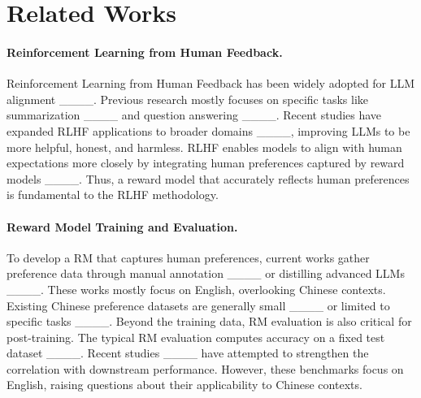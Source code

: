 \section{Related Works}
\paragraph{Reinforcement Learning from Human Feedback.}
Reinforcement Learning from Human Feedback has been widely adopted for LLM alignment ____.
Previous research mostly focuses on specific tasks like summarization ____ and question answering ____. 
Recent studies have expanded RLHF applications to broader domains ____, improving LLMs to be more helpful, honest, and harmless. 
RLHF enables models to align with human expectations more closely by integrating human preferences captured by reward models ____. 
Thus, a reward model that accurately reflects human preferences is fundamental to the RLHF methodology.

\paragraph{Reward Model Training and Evaluation.}
To develop a RM that captures human preferences, current works gather preference data through manual annotation ____ or distilling advanced LLMs ____.
These works mostly focus on English, overlooking Chinese contexts.
Existing Chinese preference datasets are generally small ____ or limited to specific tasks ____.
Beyond the training data, RM evaluation is also critical for post-training. 
The typical RM evaluation computes accuracy on a fixed test dataset ____.
Recent studies ____ have attempted to strengthen the correlation with downstream performance. 
However, these benchmarks focus on English, raising questions about their applicability to Chinese contexts.
